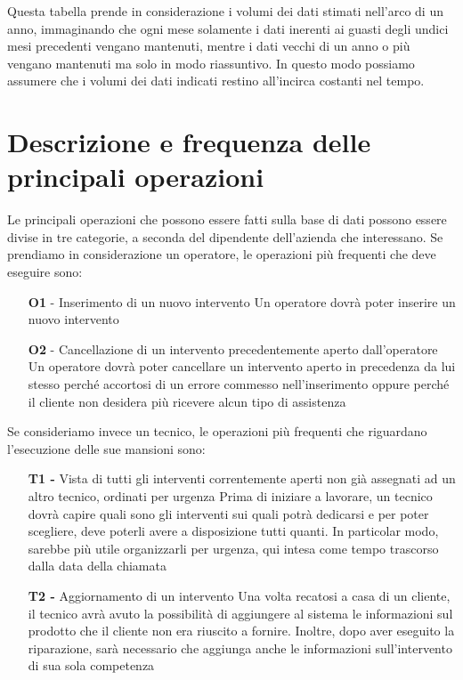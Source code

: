 \documentclass[a4paper, 12pt]{report}
\begin{document}
Questa tabella prende in considerazione i volumi dei dati stimati nell'arco di un anno, immaginando che ogni mese solamente i dati inerenti ai guasti
degli undici mesi precedenti vengano mantenuti, mentre i dati vecchi di un anno o più vengano mantenuti ma solo in modo riassuntivo. In questo modo
possiamo assumere che i volumi dei dati indicati restino all'incirca costanti nel tempo.

\section{Descrizione e frequenza delle principali operazioni}

Le principali operazioni che possono essere fatti sulla base di dati possono essere divise in tre categorie, a seconda del dipendente
dell'azienda che interessano. Se prendiamo in considerazione un operatore, le operazioni più frequenti che deve eseguire sono:

\begin{itemize}
	\item[\textbf{O1} -] Inserimento di un nuovo intervento
		\subitem Un operatore dovrà poter inserire un nuovo intervento 
	\item[\textbf{O2} -] Cancellazione di un intervento precedentemente aperto dall'operatore
		\subitem Un operatore dovrà poter cancellare un intervento aperto in precedenza da lui stesso perché accortosi di un errore commesso nell'inserimento
		oppure perché il cliente non desidera più ricevere alcun tipo di assistenza
\end{itemize}

Se consideriamo invece un tecnico, le operazioni più frequenti che riguardano l'esecuzione delle sue mansioni sono:

\begin{itemize}
	\item[\textbf{T1 -}] Vista di tutti gli interventi correntemente aperti non già assegnati ad un altro tecnico, ordinati per urgenza
		\subitem Prima di iniziare a lavorare, un tecnico dovrà capire quali sono gli interventi sui quali potrà dedicarsi e per poter scegliere, deve poterli avere a
		disposizione tutti quanti. In particolar modo, sarebbe più utile organizzarli per urgenza, qui intesa come tempo trascorso dalla data della chiamata
	\item[\textbf{T2 -}] Aggiornamento di un intervento
		\subitem Una volta recatosi a casa di un cliente, il tecnico avrà avuto la possibilità di aggiungere al sistema le informazioni sul prodotto che il cliente
		non era riuscito a fornire. Inoltre, dopo aver eseguito la riparazione, sarà necessario che aggiunga anche le informazioni sull'intervento di sua sola competenza
\end{itemize}
\end{document}
